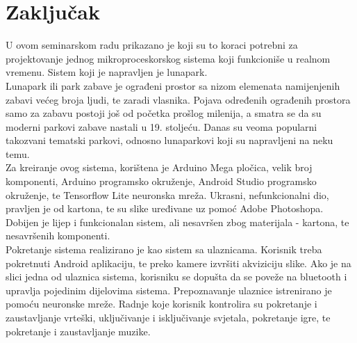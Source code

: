 \chapter{Zaključak}

U ovom seminarskom radu prikazano je koji su to koraci potrebni za projektovanje jednog mikroproceskorskog sistema koji funkcioniše u realnom vremenu. Sistem koji je napravljen je lunapark. \\

Lunapark ili park zabave je ograđeni prostor sa nizom elemenata namijenjenih zabavi većeg broja ljudi, te zaradi vlasnika. Pojava određenih ograđenih prostora samo za zabavu postoji još od početka prošlog milenija, a smatra se da su moderni parkovi zabave nastali u 19. stoljeću. Danas su veoma popularni takozvani tematski parkovi, odnosno lunaparkovi koji su napravljeni na neku temu. \\

Za kreiranje ovog sistema, korištena je Arduino Mega pločica, velik broj komponenti, Arduino programsko okruženje, Android Studio programsko okruženje, te Tensorflow Lite neuronska mreža. Ukrasni, nefunkcionalni dio, pravljen je od kartona, te su slike uređivane uz pomoć Adobe Photoshopa. Dobijen je lijep i funkcionalan sistem, ali nesavršen zbog materijala - kartona, te nesavršenih komponenti. \\

Pokretanje sistema realizirano je kao sistem sa ulaznicama. Korisnik treba pokretnuti Android aplikaciju, te preko kamere izvršiti akviziciju slike. Ako je na slici jedna od ulaznica sistema, korisniku se dopušta da se poveže na bluetooth i upravlja pojedinim dijelovima sistema. Prepoznavanje ulaznice istrenirano je pomoću neuronske mreže. Radnje koje korisnik kontrolira su pokretanje i zaustavljanje vrteški, uključivanje i isključivanje svjetala, pokretanje igre, te pokretanje i zaustavljanje muzike. 



